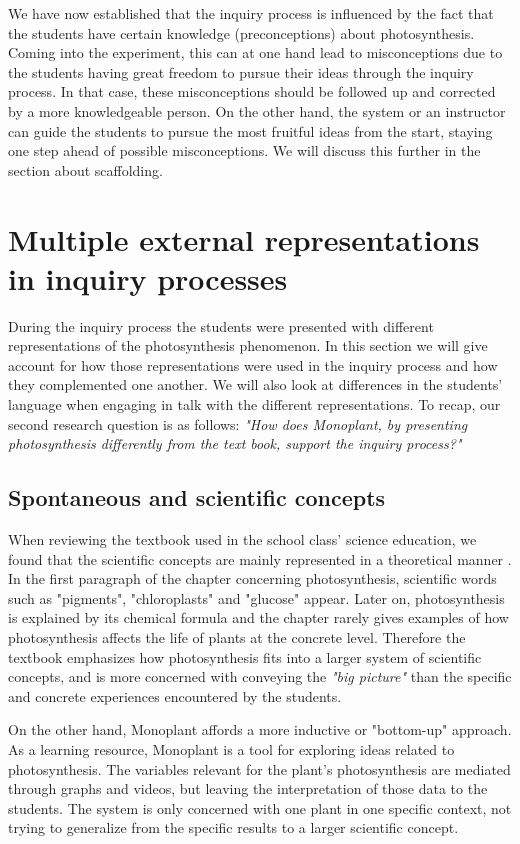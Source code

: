 We have now established that the inquiry process is influenced by the fact that the students have certain knowledge (preconceptions) about photosynthesis. Coming into the experiment, this can at one hand lead to misconceptions due to the students having great freedom to pursue their ideas through the inquiry process. In that case, these misconceptions should be followed up and corrected by a more knowledgeable person. On the other hand, the system or an instructor can guide the students to pursue the most fruitful ideas from the start, staying one step ahead of possible misconceptions. We will discuss this further in the section about scaffolding.



\section{Multiple external representations in inquiry processes}
During the inquiry process the students were presented with different representations of the photosynthesis phenomenon. In this section we will give account for how those representations were used in the inquiry process and how they complemented one another. We will also look at differences in the students' language when engaging in talk with the different representations. To recap, our second research question is as follows: \emph{"How does Monoplant, by presenting photosynthesis differently from the text book, support the inquiry process?"}

\subsection{Spontaneous and scientific concepts}
When reviewing the textbook used in the school class' science education, we found that the scientific concepts are mainly represented in a theoretical manner \citep{bios}. In the first paragraph of the chapter concerning photosynthesis, scientific words such as "pigments", "chloroplasts" and "glucose" appear. Later on, photosynthesis is explained by its chemical formula and the chapter rarely gives examples of how photosynthesis affects the life of plants at the concrete level. Therefore the textbook emphasizes how photosynthesis fits into a larger system of scientific concepts, and is more concerned with conveying the \emph{"big picture"} than the specific and concrete experiences encountered by the students. 

On the other hand, Monoplant affords a more inductive or "bottom-up" approach. As a learning resource, Monoplant is a tool for exploring ideas related to photosynthesis. The variables relevant for the plant's photosynthesis are mediated through graphs and videos, but leaving the interpretation of those data to the students. The system is only concerned with one plant in one specific context, not trying to generalize from the specific results to a larger scientific concept. 

